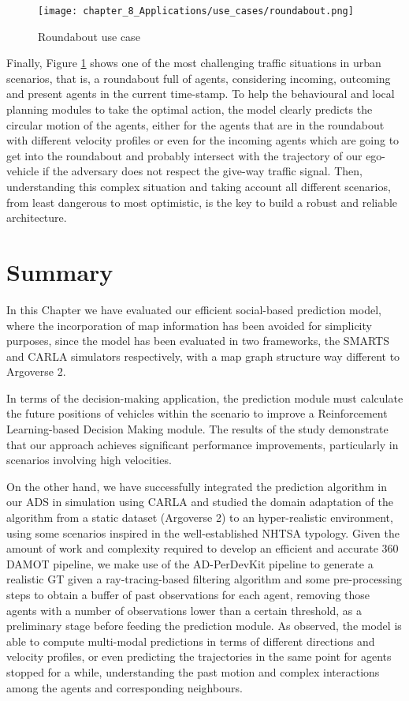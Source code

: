 \begin{figure}[!h]
	\centering
	\texttt{[image: chapter\_8\_Applications/use\_cases/roundabout.png]}
	\caption{Roundabout use case}
	\label{fig:chapter_8_Applications/use_cases/roundabout}
\end{figure}

Finally, Figure \ref{fig:chapter_8_Applications/use_cases/roundabout} shows one of the most challenging traffic situations in urban scenarios, that is, a roundabout full of agents, considering incoming, outcoming and present agents in the current time-stamp. To help the behavioural and local planning modules to take the optimal action, the model clearly predicts the circular motion of the agents, either for the agents that are in the roundabout with different velocity profiles or even for the incoming agents which are going to get into the roundabout and probably intersect with the trajectory of our ego-vehicle if the adversary does not respect the give-way traffic signal. Then, understanding this complex situation and taking account all different scenarios, from least dangerous to most optimistic, is the key to build a robust and reliable architecture.

\section{Summary}
\label{sec:8_summary}

In this Chapter we have evaluated our efficient social-based prediction model, where the incorporation of map information has been avoided for simplicity purposes, since the model has been evaluated in two frameworks, the \ac{SMARTS} and \ac{CARLA} simulators respectively, with a map graph structure way different to Argoverse 2.

In terms of the decision-making application, the prediction module must calculate the future positions of vehicles within the scenario to improve a Reinforcement Learning-based Decision Making module. The results of the study demonstrate that our approach achieves significant performance improvements, particularly in scenarios involving high velocities.

On the other hand, we have successfully integrated the prediction algorithm in our \ac{ADS} in simulation using CARLA and studied the domain adaptation of the algorithm from a static dataset (Argoverse 2) to an hyper-realistic environment, using some scenarios inspired in the well-established \ac{NHTSA} typology. Given the amount of work and complexity required to develop an efficient and accurate 360 \degree \ac{DAMOT} pipeline, we make use of the \ac{AD-PerDevKit} pipeline to generate a realistic \ac{GT} given a ray-tracing-based filtering algorithm and some pre-processing steps to obtain a buffer of past observations for each agent, removing those agents with a number of observations lower than a certain threshold, as a preliminary stage before feeding the prediction module. As observed, the model is able to compute multi-modal predictions in terms of different directions and velocity profiles, or even predicting the trajectories in the same point for agents stopped for a while, understanding the past motion and complex interactions among the agents and corresponding neighbours. 

